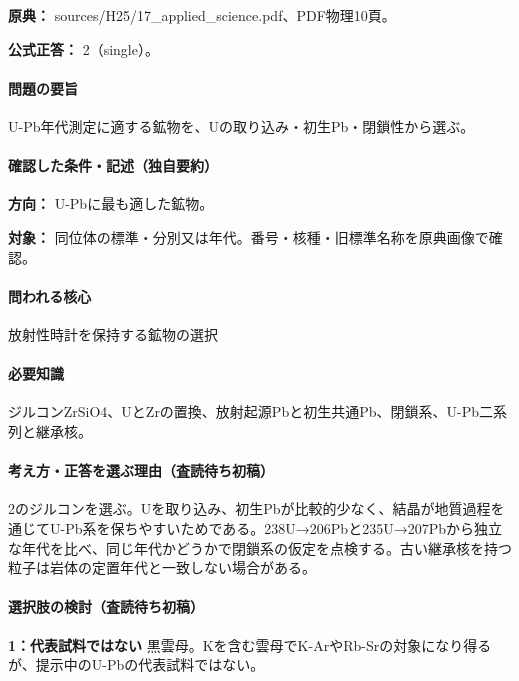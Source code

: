 \noindent\textbf{原典：} sources/H25/17\_applied\_science.pdf、PDF物理10頁。

\textbf{公式正答：} 2（single）。

\paragraph{問題の要旨} U-Pb年代測定に適する鉱物を、Uの取り込み・初生Pb・閉鎖性から選ぶ。

\paragraph{確認した条件・記述（独自要約）}\mbox{}\par

\noindent\textbf{方向：} U-Pbに最も適した鉱物。\par

\noindent\textbf{対象：} 同位体の標準・分別又は年代。番号・核種・旧標準名称を原典画像で確認。\par

\paragraph{問われる核心} 放射性時計を保持する鉱物の選択

\paragraph{必要知識} ジルコンZrSiO4、UとZrの置換、放射起源Pbと初生共通Pb、閉鎖系、U-Pb二系列と継承核。

\paragraph{考え方・正答を選ぶ理由（査読待ち初稿）} 2のジルコンを選ぶ。Uを取り込み、初生Pbが比較的少なく、結晶が地質過程を通じてU-Pb系を保ちやすいためである。238U→206Pbと235U→207Pbから独立な年代を比べ、同じ年代かどうかで閉鎖系の仮定を点検する。古い継承核を持つ粒子は岩体の定置年代と一致しない場合がある。

\paragraph{選択肢の検討（査読待ち初稿）}\mbox{}\par

\noindent\textbf{1：代表試料ではない} 黒雲母。Kを含む雲母でK-ArやRb-Srの対象になり得るが、提示中のU-Pbの代表試料ではない。\par

